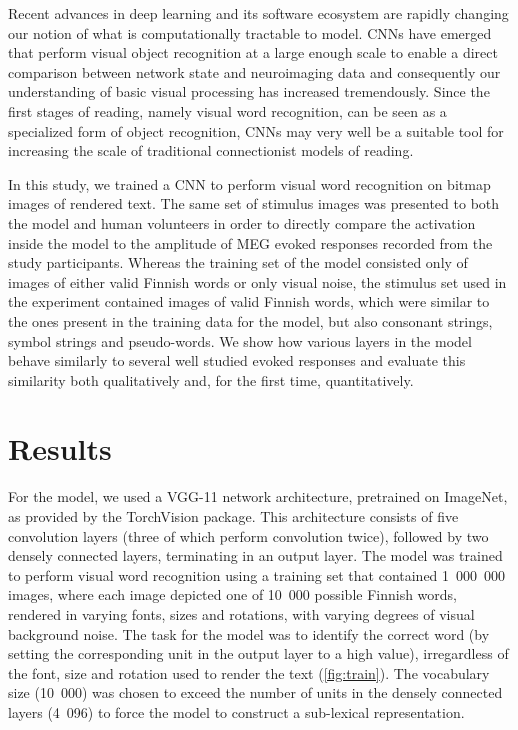 \documentclass[a4paper, 10pt]{vanvliet_paper}
\begin{document}
Recent advances in deep learning and its software ecosystem are rapidly changing our notion of what is computationally tractable to model\cite{Richards2019}.
\Glspl{CNN} have emerged that perform visual object recognition at a large enough scale to enable a direct comparison between network state and neuroimaging data\cite{Schrimpf2018, Devereux2018, Yamins2016} and consequently our understanding of basic visual processing has increased tremendously\cite{Lindsay2020}.
Since the first stages of reading, namely visual word recognition, can be seen as a specialized form of object recognition, \glspl{CNN} may very well be a suitable tool for increasing the scale of traditional connectionist models of reading.

In this study, we trained a \gls{CNN} to perform visual word recognition on bitmap images of rendered text.
The same set of stimulus images was presented to both the model and human volunteers in order to directly compare the activation inside the model to the amplitude of \gls{MEG} evoked responses recorded from the study participants.
Whereas the training set of the model consisted only of images of either valid Finnish words or only visual noise, the stimulus set used in the experiment contained images of valid Finnish words, which were similar to the ones present in the training data for the model, but also consonant strings, symbol strings and pseudo-words.
We show how various layers in the model behave similarly to several well studied evoked responses and evaluate this similarity both qualitatively and, for the first time, quantitatively.

\section{Results}

For the model, we used a \textsc{VGG}-11\cite{Szegedy2015} network architecture, pretrained on ImageNet\cite{Russakovsky2015}, as provided by the TorchVision package\cite{Marcel2010}.
This architecture consists of five convolution layers (three of which perform convolution twice), followed by two densely connected layers, terminating in an output layer.
The model was trained to perform visual word recognition using a training set that contained 1~000~000 images, where each image depicted one of 10~000 possible Finnish words, rendered in varying fonts, sizes and rotations, with varying degrees of visual background noise.
The task for the model was to identify the correct word (by setting the corresponding unit in the output layer to a high value), irregardless of the font, size and rotation used to render the text (\autoref{fig:train}).
The vocabulary size (10~000) was chosen to exceed the number of units in the densely connected layers (4~096) to force the model to construct a sub-lexical representation.
\end{document}
